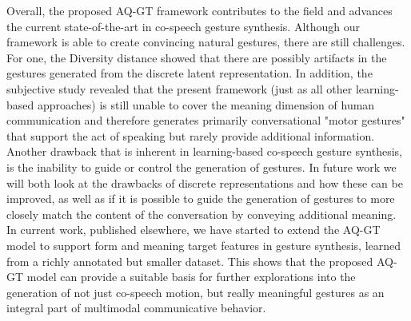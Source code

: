 \documentclass[sigconf]{acmart}
\begin{document}
Overall, the proposed AQ-GT framework contributes to the field and advances the current state-of-the-art in co-speech gesture synthesis. Although our framework is able to create convincing natural gestures, there are still challenges. For one, the Diversity distance showed that there are possibly artifacts in the gestures generated from the discrete latent representation. In addition, the subjective study revealed that the present framework (just as all other learning-based approaches) is still unable to cover the meaning dimension of human communication and therefore generates primarily conversational "motor gestures" that support the act of speaking but rarely provide additional information. Another drawback that is inherent in learning-based co-speech gesture synthesis, is the inability to guide or control the generation of gestures. In future work we will both look at the drawbacks of discrete representations and how these can be improved, as well as if it is possible to guide the generation of gestures to more closely match the content of the conversation by conveying additional meaning. In current work, published elsewhere, we have started to extend the AQ-GT model to support form and meaning target features in gesture synthesis, learned from a richly annotated but smaller dataset. This shows that the proposed AQ-GT model can provide a suitable basis for further explorations into the generation of not just co-speech motion, but really meaningful gestures as an integral part of multimodal communicative behavior.


\clearpage


\end{document}
